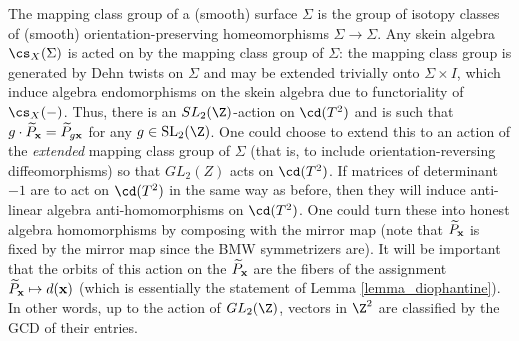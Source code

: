 \begin{remark}\label{remark_gl2z}
The mapping class group of a (smooth) surface $\Sigma$ is the group of isotopy classes of (smooth) orientation-preserving homeomorphisms $\Sigma \to \Sigma$. Any skein algebra $\cs_X(\Sigma)$ is acted on by the mapping class group of $\Sigma$: the mapping class group is generated by Dehn twists on $\Sigma$ and may be extended trivially onto $\Sigma \times I$, which induce algebra endomorphisms on the skein algebra due to functoriality of $\cs_X(-)$. Thus, there is an $SL_2(\Z)$-action on $\cd(T^2)$ and is such that $g \cdot \widetilde{P}_{\mathbf{x}} = \widetilde{P}_{g{\mathbf{x}}}$ for any $g \in \SL_2(\Z)$. One could choose to extend this to an action of the \textit{extended} mapping class group of $\Sigma$ (that is, to include orientation-reversing diffeomorphisms) so that $GL_2(Z)$ acts on $\cd(T^2)$. If matrices of determinant $-1$ are to act on $\cd(T^2)$ in the same way as before, then they will induce anti-linear algebra anti-homomorphisms on $\cd(T^2)$. One could turn these into honest algebra homomorphisms by composing with the mirror map (note that $\widetilde{P}_{\mathbf{x}}$ is fixed by the mirror map since the BMW symmetrizers are). It will be important that the orbits of this action on the $\widetilde{P}_{{\mathbf{x}}}$ are the fibers of the assignment $\widetilde{P}_{{\mathbf{x}}} \mapsto d({\mathbf{x}})$ (which is essentially the statement of Lemma \ref{lemma_diophantine}). In other words, up to the action of $GL_2(\Z)$, vectors in $\Z^2$ are classified by the GCD of their entries.
\end{remark}

